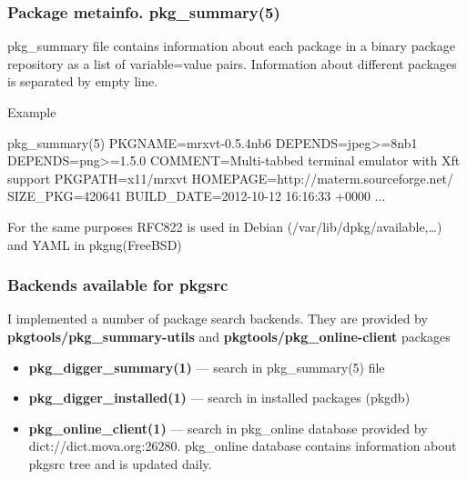 \documentclass[hyperref=unicode,ascii,xcolor=dvipsnames]{beamer}
\begin{document}
\begin{frame}[fragile]
  \frametitle{Package metainfo. pkg\_summary(5)}
pkg\_summary file
contains information about each package in a binary package
repository as a list of variable=value pairs. Information
about different packages is separated by empty line.

\begin{block}{Example}
  \begin{Code}{pkg\_summary(5)}
PKGNAME=mrxvt-0.5.4nb6
DEPENDS=jpeg>=8nb1
DEPENDS=png>=1.5.0
COMMENT=Multi-tabbed terminal emulator with Xft support
PKGPATH=x11/mrxvt
HOMEPAGE=http://materm.sourceforge.net/
SIZE\_PKG=420641
BUILD\_DATE=2012-10-12 16:16:33 +0000
...
  \end{Code}
\end{block}
For the same purposes RFC822 is used in Debian (/var/lib/dpkg/available,\dots)
and YAML in pkgng(FreeBSD)
\end{frame}


\begin{frame}[fragile]
  \frametitle{Backends available for pkgsrc}
  I implemented a number of package search backends. They 
  are provided by {\bf pkgtools/pkg\_summary-utils} and
  {\bf pkgtools/pkg\_online-client} packages
  \begin{itemize}
  \item {\bf pkg\_digger\_summary(1)} --- search in pkg\_summary(5) file
  \item {\bf pkg\_digger\_installed(1)} --- search in installed packages (pkgdb)
  \item {\bf pkg\_online\_client(1)} --- search in pkg\_online database
    provided by dict://dict.mova.org:26280. pkg\_online database contains
    information about pkgsrc tree and is updated daily.
  \end{itemize}
\end{frame}

\end{document}
